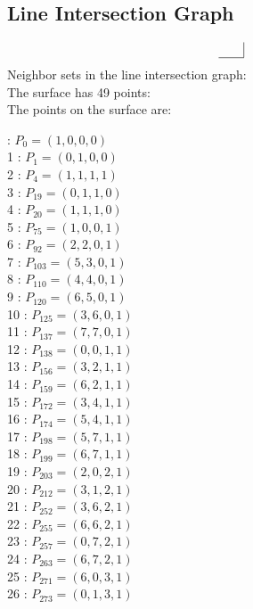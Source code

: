 \documentclass{article}
\begin{document}
{\subsection*{Line Intersection Graph}
{\arraycolsep=1pt
$$
\begin{array}{rr|*{0}r}
 & \\
\hline
\end{array}
$$
}%
Neighbor sets in the line intersection graph:\\
The surface has 49 points:\\
The points on the surface are:\\
\begin{multicols}{3}
 : $P_{0}=( 1, 0, 0, 0 )$\\
1 : $P_{1}=( 0, 1, 0, 0 )$\\
2 : $P_{4}=( 1, 1, 1, 1 )$\\
3 : $P_{19}=( 0, 1, 1, 0 )$\\
4 : $P_{20}=( 1, 1, 1, 0 )$\\
5 : $P_{75}=( 1, 0, 0, 1 )$\\
6 : $P_{92}=( 2, 2, 0, 1 )$\\
7 : $P_{103}=( 5, 3, 0, 1 )$\\
8 : $P_{110}=( 4, 4, 0, 1 )$\\
9 : $P_{120}=( 6, 5, 0, 1 )$\\
10 : $P_{125}=( 3, 6, 0, 1 )$\\
11 : $P_{137}=( 7, 7, 0, 1 )$\\
12 : $P_{138}=( 0, 0, 1, 1 )$\\
13 : $P_{156}=( 3, 2, 1, 1 )$\\
14 : $P_{159}=( 6, 2, 1, 1 )$\\
15 : $P_{172}=( 3, 4, 1, 1 )$\\
16 : $P_{174}=( 5, 4, 1, 1 )$\\
17 : $P_{198}=( 5, 7, 1, 1 )$\\
18 : $P_{199}=( 6, 7, 1, 1 )$\\
19 : $P_{203}=( 2, 0, 2, 1 )$\\
20 : $P_{212}=( 3, 1, 2, 1 )$\\
21 : $P_{252}=( 3, 6, 2, 1 )$\\
22 : $P_{255}=( 6, 6, 2, 1 )$\\
23 : $P_{257}=( 0, 7, 2, 1 )$\\
24 : $P_{263}=( 6, 7, 2, 1 )$\\
25 : $P_{271}=( 6, 0, 3, 1 )$\\
26 : $P_{273}=( 0, 1, 3, 1 )$\\

\end{multicols}}
\end{document}
